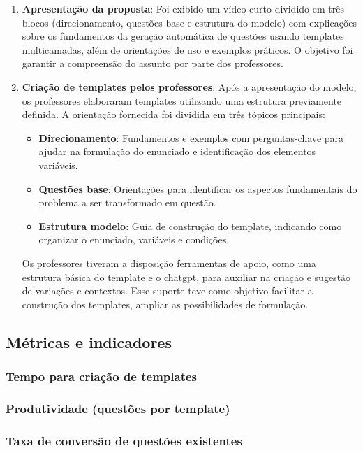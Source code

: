 \begin{enumerate}
    \item \textbf{Apresentação da proposta}: Foi exibido um vídeo curto dividido em três blocos (direcionamento, questões base e estrutura do modelo) com explicações sobre os fundamentos da geração automática de questões usando templates multicamadas, além de orientações de uso e exemplos práticos. O objetivo foi garantir a compreensão do assunto por parte dos professores.

    \item \textbf{Criação de templates pelos professores}: Após a apresentação do modelo, os professores elaboraram templates utilizando uma estrutura previamente definida. A orientação fornecida foi dividida em três tópicos principais:
    \begin{itemize}
        \item \textbf{Direcionamento}: Fundamentos e exemplos com perguntas-chave para ajudar na formulação do enunciado e identificação dos elementos variáveis.
        \item \textbf{Questões base}: Orientações para identificar os aspectos fundamentais do problema a ser transformado em questão.
        \item \textbf{Estrutura modelo}: Guia de construção do template, indicando como organizar o enunciado, variáveis e condições.
    \end{itemize}
    
    Os professores tiveram a disposição ferramentas de apoio, como uma estrutura básica do template e o \gls{chatgpt}, para auxiliar na criação e sugestão de variações e contextos. Esse suporte teve como objetivo facilitar a construção dos templates, ampliar as possibilidades de formulação.
\end{enumerate}


\subsection{Métricas e indicadores}
  \subsubsection{Tempo para criação de templates}
  \subsubsection{Produtividade (questões por template)}
  \subsubsection{Taxa de conversão de questões existentes}
